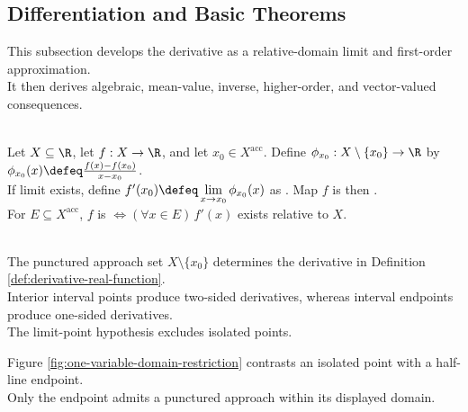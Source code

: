 \subsection{Differentiation and Basic Theorems}

%

This subsection develops the derivative as a relative-domain limit and first-order approximation.\\
It then derives algebraic, mean-value, inverse, higher-order, and vector-valued consequences.

\begin{definition} \label{def:derivative-real-function} \\
Let $X\subseteq\R$, let $f:X\to\R$, and let $x_0\in X^{\operatorname{acc}}$. Define $\phi_{x_0}:X\setminus\{x_0\}\to\R$ by $\phi_{x_0}(x)\defeq\frac{f(x)-f(x_0)}{x-x_0}$.\\
If limit exists, define $f'(x_0)\defeq\lim\limits_{x\to x_0}\phi_{x_0}(x)$ as . Map $f$ is then .\\
For $E\subseteq X^{\operatorname{acc}}$, $f$ is  $\Longleftrightarrow(\forall x\in E)\,f'(x)$ exists relative to $X$.
\end{definition}

\begin{perspective} \label{per:one-variable-domain-of-differentiability} \\
The punctured approach set $X\setminus\{x_0\}$ determines the derivative in Definition \ref{def:derivative-real-function}.\\
Interior interval points produce two-sided derivatives, whereas interval endpoints produce one-sided derivatives.\\
The limit-point hypothesis excludes isolated points.
\end{perspective}

\noindent Figure \ref{fig:one-variable-domain-restriction} contrasts an isolated point with a half-line endpoint.\\
Only the endpoint admits a punctured approach within its displayed domain.

\begin{illustrationfigure}[H]
  \centering
  
  \caption{Left: $x_0$ is isolated. Right: $X=[x_0,\infty)$ permits right-sided approach to $x_0$.}
  \label{fig:one-variable-domain-restriction}
\end{illustrationfigure}

